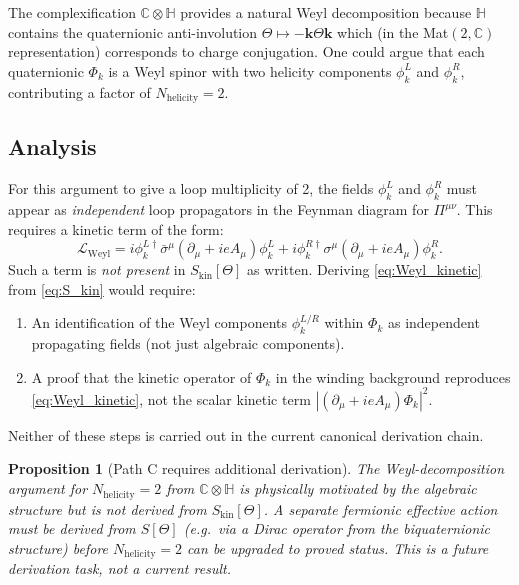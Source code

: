\documentclass[12pt,a4paper]{article}
\newtheorem{proposition}[theorem]{Proposition}
\theoremstyle{remark}
\newcommand{\Nhelicity}{N_{\mathrm{helicity}}}
\begin{document}
The complexification $\mathbb{C}\otimes\mathbb{H}$ provides a natural Weyl
decomposition because $\mathbb{H}$ contains the quaternionic anti-involution
$\Theta \mapsto -\mathbf{k}\Theta\mathbf{k}$ which (in the Mat$(2,\mathbb{C})$
representation) corresponds to charge conjugation.  One could argue that each
quaternionic $\Phi_k$ is a Weyl spinor with two helicity components $\phi_k^L$
and $\phi_k^R$, contributing a factor of $\Nhelicity = 2$.

\subsection{Analysis}

For this argument to give a loop multiplicity of 2, the fields $\phi_k^L$ and
$\phi_k^R$ must appear as \emph{independent} loop propagators in the Feynman
diagram for $\Pi^{\mu\nu}$.  This requires a kinetic term of the form:
\begin{equation}
  \mathcal{L}_{\mathrm{Weyl}}
  = i\phi_k^{L\dagger}\bar\sigma^\mu({\partial}_\mu + ieA_\mu)\phi_k^L
  + i\phi_k^{R\dagger}\sigma^\mu({\partial}_\mu + ieA_\mu)\phi_k^R.
  \label{eq:Weyl_kinetic}
\end{equation}
Such a term is \emph{not present} in $S_{\mathrm{kin}}[\Theta]$ as written.
Deriving \eqref{eq:Weyl_kinetic} from \eqref{eq:S_kin} would require:
\begin{enumerate}
  \item An identification of the Weyl components $\phi_k^{L/R}$ within $\Phi_k$
        as independent propagating fields (not just algebraic components).
  \item A proof that the kinetic operator of $\Phi_k$ in the winding background
        reproduces \eqref{eq:Weyl_kinetic}, not the scalar kinetic term
        $|({\partial}_\mu + ieA_\mu)\Phi_k|^2$.
\end{enumerate}

Neither of these steps is carried out in the current canonical derivation chain.

\begin{proposition}[Path C requires additional derivation]
\label{prop:pathC}
The Weyl-decomposition argument for $\Nhelicity = 2$ from $\mathbb{C}\otimes\mathbb{H}$
is physically motivated by the algebraic structure but is not derived from
$S_{\mathrm{kin}}[\Theta]$.  A separate fermionic effective action must be derived
from $S[\Theta]$ (e.g.\ via a Dirac operator from the biquaternionic structure)
before $\Nhelicity = 2$ can be upgraded to proved status.  This is a future
derivation task, not a current result.
\end{proposition}
\end{document}
